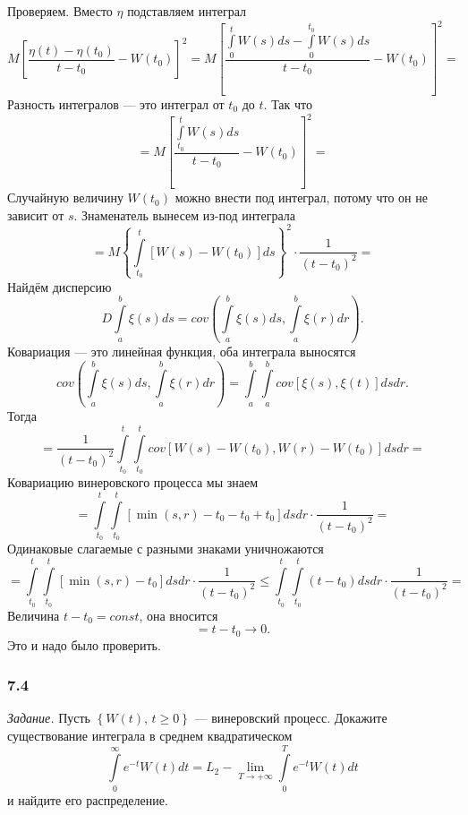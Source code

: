Проверяем.
Вместо $ \eta $ подставляем интеграл
$$M \left[
    \frac{ \eta \left( t \right) - \eta \left( t_0 \right) }{t - t_0} - W \left( t_0 \right)
  \right]^2 =
  M \left[
    \frac{ \int \limits_0^t W \left( s \right) ds - \int \limits_0^{t_0} W \left( s \right) ds}{t - t_0} -
    W \left( t_0 \right)
  \right]^2 =$$
Разность интегралов --- это интеграл от $t_0$ до $t$.
Так что
$$= M \left[
    \frac{\int \limits_{t_0}^t W \left( s \right) ds}{t - t_0} - W \left( t_0 \right)
  \right]^2 =$$
Случайную величину $W \left( t_0 \right) $ можно внести под интеграл,
потому что он не зависит от $s$.
Знаменатель вынесем из-под интеграла
$$= M \left\{
    \int \limits_{t_0}^t \left[
      W \left( s \right) - W \left( t_0 \right)
    \right] ds
  \right\}^2 \cdot
  \frac{1}{ \left( t - t_0 \right)^2} =$$
Найдём дисперсию
$$D \int \limits_a^b \xi \left( s \right) ds =
  cov \left(
    \int \limits_a^b \xi \left( s \right) ds, \int \limits_a^b \xi \left( r \right) dr
  \right).$$
Ковариация --- это линейная функция, оба интеграла выносятся
$$cov \left(
    \int \limits_a^b \xi \left( s \right) ds, \int \limits_a^b \xi \left( r \right) dr
  \right) =
  \int \limits_a^b \int \limits_a^b
    cov \left[ \xi \left( s \right), \xi \left( t \right) \right]
  dsdr.$$
Тогда
$$= \frac{1}{ \left( t - t_0 \right)^2} \int \limits_{t_0}^t \int \limits_{t_0}^t cov \left[
    W \left( s \right) - W \left( t_0 \right), W \left( r \right) - W \left( t_0 \right) \right]
  dsdr =$$
Ковариацию винеровского процесса мы знаем
$$= \int \limits_{t_0}^t \int \limits_{t_0}^t \left[
    \min \left( s, r \right) - t_0 - t_0 + t_0 \right] dsdr \cdot
  \frac{1}{ \left( t - t_0 \right)^2} =$$
Одинаковые слагаемые с разными знаками уничножаются
$$= \int \limits_{t_0}^t \int \limits_{t_0}^t
    \left[ \min \left( s, r \right) - t_0 \right] dsdr \cdot
  \frac{1}{ \left( t - t_0 \right)^2} \leq
  \int \limits_{t_0}^t \int \limits_{t_0}^t \left( t - t_0 \right) dsdr \cdot
  \frac{1}{ \left( t - t_0 \right)^2} =$$
Величина $t - t_0 = const$, она вносится
$$= t - t_0 \to
  0.$$
Это и надо было проверить.

\subsubsection*{7.4}

\textit{Задание.}
Пусть $ \left\{ W \left( t \right), \, t \geq 0 \right\} $ --- винеровский процесс.
Докажите существование интеграла в среднем квадратическом
$$ \int \limits_0^{ \infty } e^{-t} W \left( t \right) dt =
  L_2-\lim \limits_{T \to + \infty } \int \limits_0^T e^{-t} W \left( t \right) dt$$
и найдите его распределение.

